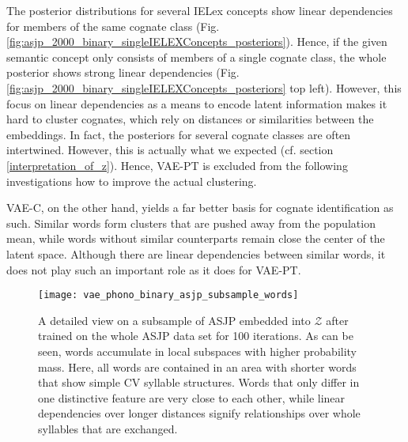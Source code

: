 \documentclass[6pt]{article}
\begin{document}
The posterior distributions for several IELex concepts show linear dependencies for members of the same cognate class (Fig. \ref{fig:asjp_2000_binary_singleIELEXConcepts_posteriors}). Hence, if the given semantic concept only consists of members of a single cognate class, the whole posterior shows strong linear dependencies (Fig. \ref{fig:asjp_2000_binary_singleIELEXConcepts_posteriors} top left). However, this focus on linear dependencies as a means to encode latent information makes it hard to cluster cognates, which rely on distances or similarities between the embeddings. In fact, the posteriors for several cognate classes are often intertwined. However, this is actually what we expected (cf. section \ref{interpretation_of_z}). Hence, VAE-PT is excluded from the following investigations how to improve the actual clustering.


VAE-C, on the other hand, yields a far better basis for cognate identification as such. Similar words form clusters that are pushed away from the population mean, while words without similar counterparts remain close the center of the latent space. Although there are linear dependencies between similar words, it does not play such an important role as it does for VAE-PT.  
\begin{figure}[h!] %
   \centering
   \texttt{[image: vae\_phono\_binary\_asjp\_subsample\_words]} 
   \caption{A detailed view on a subsample of ASJP embedded into $\mathcal{Z}$ after trained on the whole ASJP data set for 100 iterations. As can be seen, words accumulate in local subspaces with higher probability mass. Here, all words are contained in an area with shorter words that show simple CV syllable structures. Words that only differ in one distinctive feature are very close to each other, while linear dependencies over longer distances signify relationships over whole syllables that are exchanged.}
   \label{fig:vae_phono_binary_asjp_subsample_words}
\end{figure}
\end{document}
